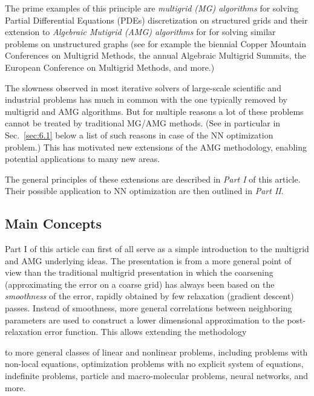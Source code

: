 \documentclass{article} %
\begin{document}
The prime examples of this principle are {\it multigrid (MG) algorithms} for solving Partial Differential Equations (PDEs) discretization on structured grids \cite{brandt77} and their extension to {\it Algebraic Mutigrid (AMG) algorithms} for for solving similar problems on unstructured graphs (see for example the biennial Copper Mountain Conferences on Multigrid Methods, the annual Algebraic Multigrid Summits, the European Conference on Multigrid Methods, and more.)

The slowness observed in most iterative solvers of large-scale scientific and industrial problems has much in common with the one typically removed by multigrid and AMG algorithms. But for multiple reasons a lot of these problems cannot be treated by traditional MG/AMG methods. (See in particular in Sec.~\ref{sec:6.1} below a list of such reasons in case of the NN optimization problem.) This has motivated new extensions of the AMG methodology, enabling potential applications to many new areas.

The general principles of these extensions are described in {\it Part I} of this article. Their possible application to NN optimization are then outlined in {\it Part II}.

\subsection{Main Concepts}
Part I of this article can first of all serve as a simple introduction to the multigrid and AMG underlying ideas. The presentation is from a more general point of view than the traditional multigrid presentation in which the coarsening (approximating the error on a coarse grid) has always been based on the {\it smoothness} of the error, rapidly obtained by few relaxation (gradient descent) passes. Instead of smoothness, more general correlations between neighboring parameters are used to construct a lower dimensional approximation to the post-relaxation error function. This allows extending the methodology

to more general classes of linear and nonlinear problems, including problems with non-local equations, optimization problems with no explicit system of equations, indefinite problems, particle and macro-molecular problems, neural networks, and more.
\end{document}
